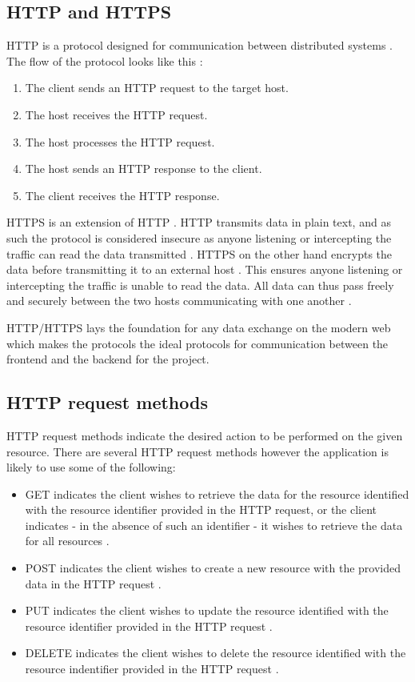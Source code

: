 \subsection{HTTP and HTTPS}
HTTP is a protocol designed for communication between distributed systems \cite{mozilla_what_is_http}.
The flow of the protocol looks like this \cite{mozilla_http_flow}:
\begin{enumerate}
    \item The client sends an HTTP request to the target host.
    \item The host receives the HTTP request.
    \item The host processes the HTTP request.
    \item The host sends an HTTP response to the client.
    \item The client receives the HTTP response.
\end{enumerate}

HTTPS is an extension of HTTP \cite{http_vs_https}.
HTTP transmits data in plain text, and as such the protocol is considered insecure as anyone listening or intercepting the traffic can read the data transmitted \cite{http_vs_https}.
HTTPS on the other hand encrypts the data before transmitting it to an external host \cite{https_explained}.
This ensures anyone listening or intercepting the traffic is unable to read the data.
All data can thus pass freely and securely between the two hosts communicating with one another \cite{http_vs_https}.

HTTP/HTTPS lays the foundation for any data exchange \cite{mozilla_http_overview} on the modern web \cite{tutsplus_what_is_http} which makes the protocols the ideal protocols for communication between the frontend and the backend for the project.

\subsection{HTTP request methods}
HTTP request methods indicate the desired action to be performed on the given resource.
There are several HTTP request methods \cite{mozilla_http_status_methods_list} however the application is likely to use some of the following:
\begin{itemize}
    \item GET indicates the client wishes to retrieve the data for the resource identified with the resource identifier provided in the HTTP request, or the client indicates - in the absence of such an identifier - it wishes to retrieve the data for all resources \cite{mozilla_http_status_methods_list}.
    \item POST indicates the client wishes to create a new resource with the provided data in the HTTP request \cite{mozilla_http_status_methods_list}.
    \item PUT indicates the client wishes to update the resource identified with the resource identifier provided in the HTTP request \cite{mozilla_http_status_methods_list}.
    \item DELETE indicates the client wishes to delete the resource identified with the resource indentifier provided in the HTTP request \cite{mozilla_http_status_methods_list}.
\end{itemize}

